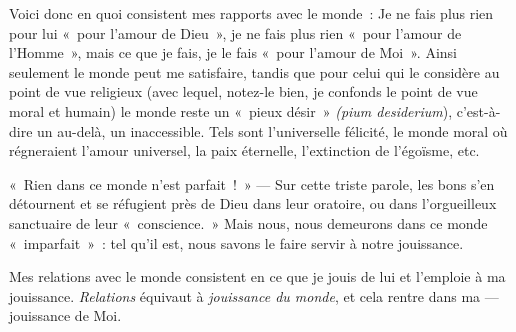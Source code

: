 \documentclass[french,twoside]{book} %
\begin{document}
Voici donc en quoi consistent mes rapports avec le monde : Je ne fais plus rien pour lui « pour l’amour de Dieu », je ne fais plus rien « pour l’amour de l’Homme », mais ce que je fais, je le fais « pour l’amour de Moi ». Ainsi seulement le monde peut me satisfaire, tandis que pour celui qui le considère au point de vue religieux (avec lequel, notez-le bien, je confonds le point de vue moral et humain) le monde reste un « pieux désir » \emph{(pium desiderium}), c’est-à-dire un au-delà, un inaccessible. Tels sont l’universelle félicité, le monde moral où régneraient l’amour universel,  la paix éternelle, l’extinction de l’égoïsme, etc.\par
« Rien dans ce monde n’est parfait ! » — Sur cette triste parole, les bons s’en détournent et se réfugient près de Dieu dans leur oratoire, ou dans l’orgueilleux sanctuaire de leur « conscience. » Mais nous, nous demeurons dans ce monde « imparfait » : tel qu’il est, nous savons le faire servir à notre jouissance.\par
Mes relations avec le monde consistent en ce que je jouis de lui et l’emploie à ma jouissance. \emph{Relations }équivaut à \emph{jouissance du monde}, et cela rentre dans ma — jouissance de Moi.
\end{document}
